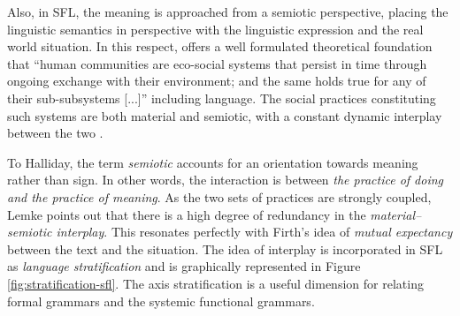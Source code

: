     Also, in SFL, the meaning is approached from a semiotic perspective, placing the linguistic semantics in perspective with the linguistic expression and the real world situation. 
    In this respect, \citet{Lemke93} offers a well formulated theoretical foundation that ``human communities are eco-social systems that persist in time through ongoing exchange with their environment; and the same holds true for any of their sub-subsystems [...]'' including language. The social practices constituting such systems are both material and semiotic, with a constant dynamic interplay between the two \citep[387]{Halliday2002}.
    
    To Halliday, the term \textit{semiotic} accounts for an orientation towards meaning rather than sign. In other words, the interaction is between \textit{the practice of doing and the practice of meaning}. As the two sets of practices are strongly coupled, Lemke points out that there is a high degree of redundancy in the \textit{material--semiotic interplay}. This resonates perfectly with Firth's idea of \textit{mutual expectancy} between the text and the situation. The idea of interplay is incorporated in SFL as \textit{language stratification} \citep{Taverniers2011} and is graphically represented in Figure \ref{fig:stratification-sfl}.
    The axis stratification is a useful dimension for relating formal grammars and the systemic functional grammars. %
    
